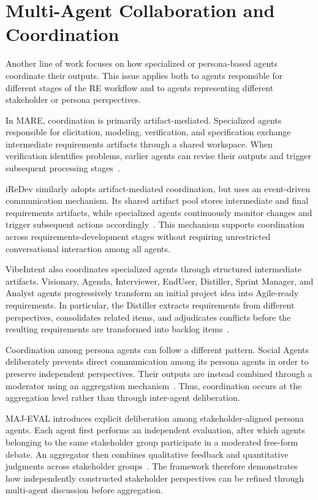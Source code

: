 \section{Multi-Agent Collaboration and Coordination}
\label{sec:rw-coordination}

Another line of work focuses on how specialized or persona-based agents coordinate their outputs. This issue applies both to agents responsible for different stages of the RE workflow and to agents representing different stakeholder or persona perspectives.

In MARE, coordination is primarily artifact-mediated. Specialized agents responsible for elicitation, modeling, verification, and specification exchange intermediate requirements artifacts through a shared workspace. When verification identifies problems, earlier agents can revise their outputs and trigger subsequent processing stages~\cite{mare2024}.

iReDev similarly adopts artifact-mediated coordination, but uses an event-driven communication mechanism. Its shared artifact pool stores intermediate and final requirements artifacts, while specialized agents continuously monitor changes and trigger subsequent actions accordingly~\cite{jin2025iredev}. This mechanism supports coordination across requirements-development stages without requiring unrestricted conversational interaction among all agents.

VibeIntent also coordinates specialized agents through structured intermediate artifacts. Visionary, Agenda, Interviewer, EndUser, Distiller, Sprint Manager, and Analyst agents progressively transform an initial project idea into Agile-ready requirements. In particular, the Distiller extracts requirements from different perspectives, consolidates related items, and adjudicates conflicts before the resulting requirements are transformed into backlog items~\cite{vibeintent2026}.

Coordination among persona agents can follow a different pattern. Social Agents deliberately prevents direct communication among its persona agents in order to preserve independent perspectives. Their outputs are instead combined through a moderator using an aggregation mechanism~\cite{bhattacharyya2026social}. Thus, coordination occurs at the aggregation level rather than through inter-agent deliberation.

MAJ-EVAL introduces explicit deliberation among stakeholder-aligned persona agents. Each agent first performs an independent evaluation, after which agents belonging to the same stakeholder group participate in a moderated free-form debate. An aggregator then combines qualitative feedback and quantitative judgments across stakeholder groups~\cite{chen2026majeval}. The framework therefore demonstrates how independently constructed stakeholder perspectives can be refined through multi-agent discussion before aggregation.


